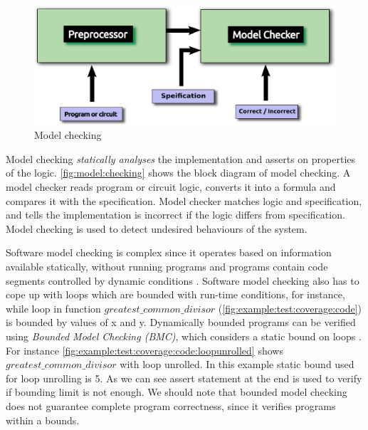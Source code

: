 \begin{figure}[h]
    \centering
\includegraphics[width=\linewidth]{images/modelChecking.pdf}
   \caption{Model checking \cite{clarke2008birth}}
   \label{fig:model:checking}
\end{figure}

Model checking \emph{statically analyses} the implementation and asserts on properties of the logic. \autoref{fig:model:checking} shows the block diagram of model checking. A model checker reads program or circuit logic, converts it into a formula and compares it with the specification. Model checker matches logic and specification, and tells the implementation is incorrect if the logic differs from specification. Model checking is used to detect undesired behaviours of the system.

Software model checking is complex since it operates based on information available statically, without running programs and programs contain code segments controlled by dynamic conditions \cite{godefroid2005software}. Software model checking also has to cope up with loops which are bounded with run-time conditions, for instance, while loop in function $greatest\_common\_divisor$ (\autoref{fig:example:test:coverage:code}) is bounded by values of x and y. Dynamically bounded programs can be verified using \emph{Bounded Model Checking (BMC)}, which considers a static bound on loops \cite{biere2003bounded}. For instance \autoref{fig:example:test:coverage:code:loopunrolled} shows $greatest\_common\_divisor$ with loop unrolled. In this example static bound used for loop unrolling is 5. As we can see assert statement at the end is used to verify if bounding limit is not enough. We should note that bounded model checking does not guarantee complete program correctness, since it verifies programs within a bounds.


